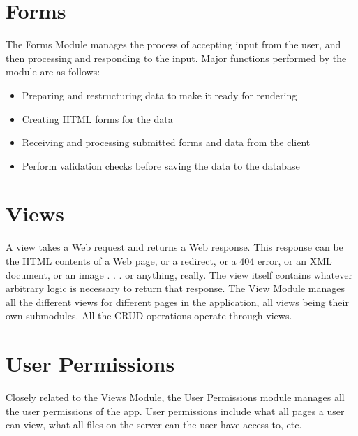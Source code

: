 \newpage

\section{Forms}
The Forms Module manages the process of accepting input from the user, and then processing and responding to the input. Major functions performed by the module are as follows:
\begin{itemize}
	\item Preparing and restructuring data to make it ready for rendering
	\item Creating HTML forms for the data
	\item Receiving and processing submitted forms and data from the client
	\item Perform validation checks before saving the data to the database
\end{itemize}

\section{Views}
A view takes a Web request and returns a Web response. This response can be the HTML contents of a Web page, or a redirect, or a 404 error, or an XML document, or an image . . . or anything, really. The view itself contains whatever arbitrary logic is necessary to return that response. The View Module manages all the different views for different pages in the application, all views being their own submodules. All the CRUD operations operate through views.

\section{User Permissions}
Closely related to the Views Module, the User Permissions module manages all the user permissions of the app. User permissions include what all pages a user can view, what all files on the server can the user have access to, etc.